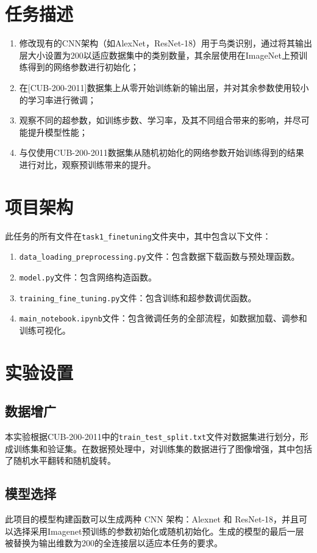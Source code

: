 \documentclass[notitlepage,cs4size,punct,oneside]{ctexrep}
\numberwithin{equation}{chapter}
\theoremstyle{mystyle}
\begin{document}
\section{任务描述}
\begin{enumerate}
\item 修改现有的CNN架构（如AlexNet，ResNet-18）用于鸟类识别，通过将其输出层大小设置为200以适应数据集中的类别数量，其余层使用在ImageNet上预训练得到的网络参数进行初始化；
\item 在[CUB-200-2011]数据集上从零开始训练新的输出层，并对其余参数使用较小的学习率进行微调；
\item 观察不同的超参数，如训练步数、学习率，及其不同组合带来的影响，并尽可能提升模型性能；
\item 与仅使用CUB-200-2011数据集从随机初始化的网络参数开始训练得到的结果进行对比，观察预训练带来的提升。
\end{enumerate}

\section{项目架构}
此任务的所有文件在\texttt{task1\_finetuning}文件夹中，其中包含以下文件：
\begin{enumerate}
\item \texttt{data\_loading\_preprocessing.py}文件：包含数据下载函数与预处理函数。
\item \texttt{model.py}文件：包含网络构造函数。
\item \texttt{training\_fine\_tuning.py}文件：包含训练和超参数调优函数。
\item \texttt{main\_notebook.ipynb}文件：包含微调任务的全部流程，如数据加载、调参和训练可视化。
\end{enumerate}

\section{实验设置}
\subsection{数据增广}
本实验根据CUB-200-2011中的\texttt{train\_test\_split.txt}文件对数据集进行划分，形成训练集和验证集。在数据预处理中，对训练集的数据进行了图像增强，其中包括了随机水平翻转和随机旋转。

\subsection{模型选择}
此项目的模型构建函数可以生成两种 CNN 架构：Alexnet 和 ResNet-18，并且可以选择采用Imagenet预训练的参数初始化或随机初始化。生成的模型的最后一层被替换为输出维数为200的全连接层以适应本任务的要求。
\end{document}
